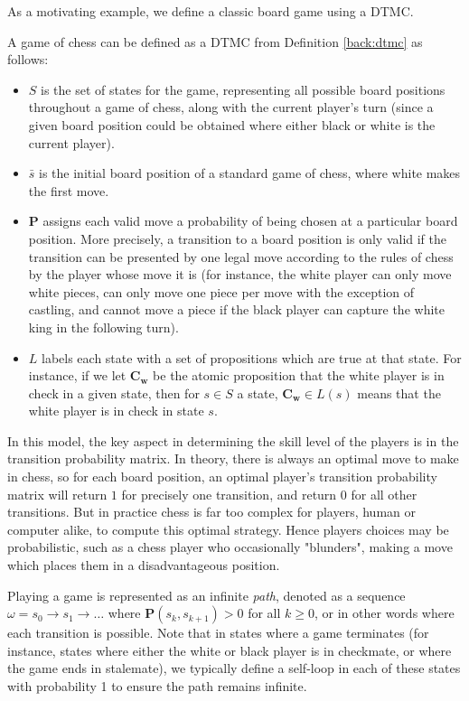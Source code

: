 As a motivating example, we define a classic board game using a DTMC.

\begin{example}
\label{back:chess}
    A game of chess can be defined as a DTMC from Definition \ref{back:dtmc} as follows:

    \begin{itemize}
        \item $S$ is the set of states for the game, representing all possible board positions throughout a game of chess, along with the current player's turn (since a given board position could be obtained where either black or white is the current player).
        \item $\bar{s}$ is the initial board position of a standard game of chess, where white makes the first move.
        \item $\mathbf{P}$ assigns each valid move a probability of being chosen at a particular board position. More precisely, a transition to a board position is only valid if the transition can be presented by one legal move according to the rules of chess by the player whose move it is (for instance, the white player can only move white pieces, can only move one piece per move with the exception of castling, and cannot move a piece if the black player can capture the white king in the following turn).
        \item $L$ labels each state with a set of propositions which are true at that state. For instance, if we let $\mathbf{C_w}$ be the atomic proposition that the white player is in check in a given state, then for $s \in S$ a state, $\mathbf{C_w} \in L(s)$ means that the white player is in check in state $s$.
    \end{itemize}

    In this model, the key aspect in determining the skill level of the players is in the transition probability matrix. In theory, there is always an optimal move to make in chess, so for each board position, an optimal player's transition probability matrix will return $1$ for precisely one transition, and return $0$ for all other transitions. But in practice chess is far too complex for players, human or computer alike, to compute this optimal strategy. Hence players choices may be probabilistic, such as a chess player who occasionally "blunders", making a move which places them in a disadvantageous position.
\end{example}

Playing a game is represented as an infinite \emph{path}, denoted as a sequence $\omega = s_0 \rightarrow s_1 \rightarrow \dots$ where $\mathbf{P}(s_k, s_{k+1})>0$ for all $k\geq0$, or in other words where each transition is possible. Note that in states where a game terminates (for instance, states where either the white or black player is in checkmate, or where the game ends in stalemate), we typically define a self-loop in each of these states with probability 1 to ensure the path remains infinite.

